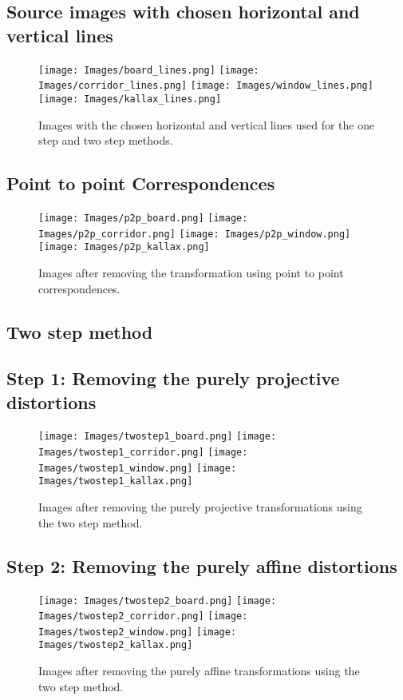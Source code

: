 \documentclass{article}
\begin{document}
\subsection{Source images with chosen horizontal and vertical lines}
\begin{figure}[H]
    \centering
    \texttt{[image: Images/board\_lines.png]}
    \texttt{[image: Images/corridor\_lines.png]}
    \texttt{[image: Images/window\_lines.png]}
    \texttt{[image: Images/kallax\_lines.png]}
    \caption{Images with the chosen horizontal and vertical lines used for the one step and two step methods.}
    \label{fig:enter-label}
\end{figure}


\subsection{Point to point Correspondences}
\begin{figure}[H]
    \centering
    \texttt{[image: Images/p2p\_board.png]}
    \texttt{[image: Images/p2p\_corridor.png]}
    \texttt{[image: Images/p2p\_window.png]}
    \texttt{[image: Images/p2p\_kallax.png]}
    \caption{Images after removing the transformation using point to point correspondences.}
    \label{fig:enter-label}
\end{figure}

\subsection{Two step method}
\subsection{Step 1: Removing the purely projective distortions}
\begin{figure}[H]
    \centering
    \texttt{[image: Images/twostep1\_board.png]}
    \texttt{[image: Images/twostep1\_corridor.png]}
    \texttt{[image: Images/twostep1\_window.png]}
    \texttt{[image: Images/twostep1\_kallax.png]}
    \caption{Images after removing the purely projective transformations using the two step method.}
    \label{fig:enter-label}
\end{figure}


\subsection{Step 2: Removing the purely affine distortions}
\begin{figure}[H]
    \centering
    \texttt{[image: Images/twostep2\_board.png]}
    \texttt{[image: Images/twostep2\_corridor.png]}
    \texttt{[image: Images/twostep2\_window.png]}
    \texttt{[image: Images/twostep2\_kallax.png]}
    \caption{Images after removing the purely affine transformations using the two step method.}
    \label{fig:enter-label}
\end{figure}
\end{document}
